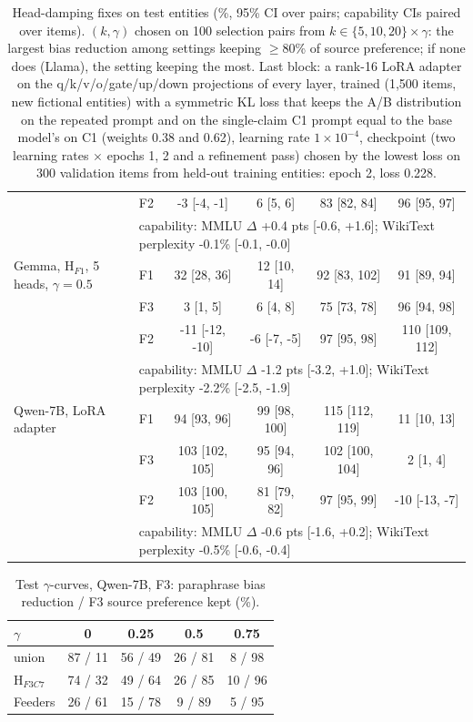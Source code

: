 \begin{table}[!htbp]
\begin{tabular}{@{}llcccc@{}}
 & F2 & -3 [-4, -1] & 6 [5, 6] & 83 [82, 84] & 96 [95, 97] \\
 & \multicolumn{5}{l}{capability: MMLU $\Delta$ +0.4 pts [-0.6, +1.6]; WikiText perplexity -0.1\% [-0.1, -0.0]} \\ \midrule
Gemma, H$_{F1}$, 5 heads, $\gamma{=}0.5$ & F1 & 32 [28, 36] & 12 [10, 14] & 92 [83, 102] & 91 [89, 94] \\
 & F3 & 3 [1, 5] & 6 [4, 8] & 75 [73, 78] & 96 [94, 98] \\
 & F2 & -11 [-12, -10] & -6 [-7, -5] & 97 [95, 98] & 110 [109, 112] \\
 & \multicolumn{5}{l}{capability: MMLU $\Delta$ -1.2 pts [-3.2, +1.0]; WikiText perplexity -2.2\% [-2.5, -1.9]} \\ \midrule
Qwen-7B, LoRA adapter & F1 & 94 [93, 96] & 99 [98, 100] & 115 [112, 119] & 11 [10, 13] \\
 & F3 & 103 [102, 105] & 95 [94, 96] & 102 [100, 104] & 2 [1, 4] \\
 & F2 & 103 [100, 105] & 81 [79, 82] & 97 [95, 99] & -10 [-13, -7] \\
 & \multicolumn{5}{l}{capability: MMLU $\Delta$ -0.6 pts [-1.6, +0.2]; WikiText perplexity -0.5\% [-0.6, -0.4]} \\
\bottomrule\end{tabular}\caption{Head-damping fixes on test entities (\%, 95\% CI over pairs; capability CIs paired over items). $(k,\gamma)$ chosen on 100 selection pairs from $k \in \{5,10,20\} \times \gamma$: the largest bias reduction among settings keeping $\ge$80\% of source preference; if none does (Llama), the setting keeping the most. Last block: a rank-16 LoRA adapter on the q/k/v/o/gate/up/down projections of every layer, trained (1,500 items, new fictional entities) with a symmetric KL loss that keeps the A/B distribution on the repeated prompt and on the single-claim C1 prompt equal to the base model's on C1 (weights 0.38 and 0.62), learning rate $1\times10^{-4}$, checkpoint (two learning rates $\times$ epochs 1, 2 and a refinement pass) chosen by the lowest loss on 300 validation items from held-out training entities: epoch 2, loss 0.228.}\end{table}
\begin{table}[!htbp]\centering\scriptsize\begin{tabular}{@{}lcccc@{}}\toprule $\gamma$ & 0 & 0.25 & 0.5 & 0.75 \\ \midrule
union & 87 / 11 & 56 / 49 & 26 / 81 & 8 / 98 \\
H$_{F3C7}$ & 74 / 32 & 49 / 64 & 26 / 85 & 10 / 96 \\
Feeders & 26 / 61 & 15 / 78 & 9 / 89 & 5 / 95 \\
\bottomrule\end{tabular}\caption{Test $\gamma$-curves, Qwen-7B, F3: paraphrase bias reduction / F3 source preference kept (\%).}\end{table}
